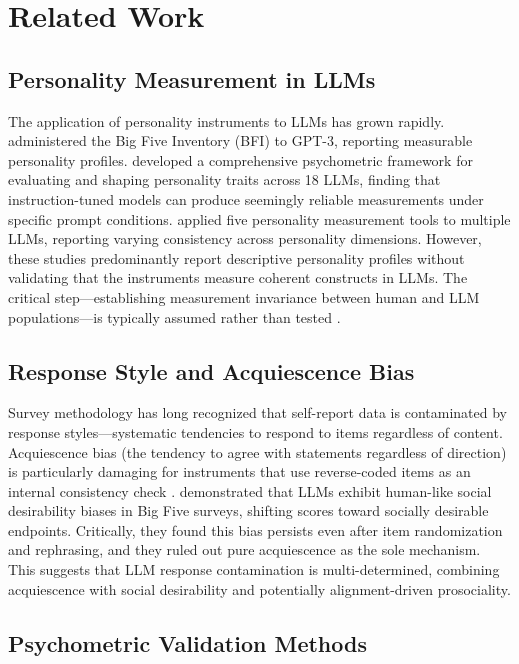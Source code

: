 \section{Related Work}

\subsection{Personality Measurement in LLMs}

The application of personality instruments to LLMs has grown rapidly. \citet{miotto2023gpt3} administered the Big Five Inventory (BFI) to GPT-3, reporting measurable personality profiles. \citet{serapio2025psychometric} developed a comprehensive psychometric framework for evaluating and shaping personality traits across 18 LLMs, finding that instruction-tuned models can produce seemingly reliable measurements under specific prompt conditions. \citet{bhandari2025evaluating} applied five personality measurement tools to multiple LLMs, reporting varying consistency across personality dimensions. However, these studies predominantly report descriptive personality profiles without validating that the instruments measure coherent constructs in LLMs. The critical step---establishing measurement invariance between human and LLM populations---is typically assumed rather than tested \citep{suhr2025challenging}.

\subsection{Response Style and Acquiescence Bias}

Survey methodology has long recognized that self-report data is contaminated by response styles---systematic tendencies to respond to items regardless of content. Acquiescence bias (the tendency to agree with statements regardless of direction) is particularly damaging for instruments that use reverse-coded items as an internal consistency check \citep{lord1968statistical}. \citet{acerbi2024llm} demonstrated that LLMs exhibit human-like social desirability biases in Big Five surveys, shifting scores toward socially desirable endpoints. Critically, they found this bias persists even after item randomization and rephrasing, and they ruled out pure acquiescence as the sole mechanism. This suggests that LLM response contamination is multi-determined, combining acquiescence with social desirability and potentially alignment-driven prosociality.

\subsection{Psychometric Validation Methods}

